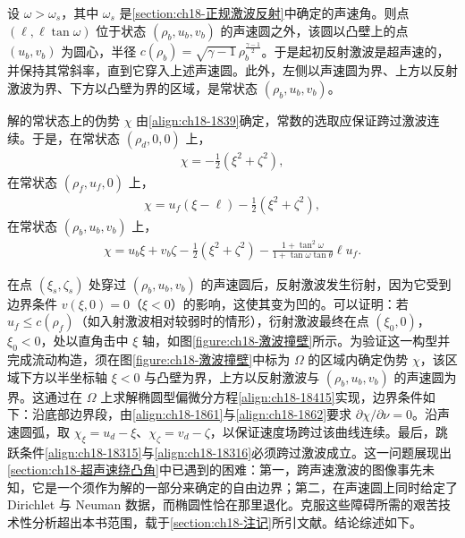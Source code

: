 \documentclass[../../main.tex]{subfiles}
\begin{document}
设 $\omega>\omega_s$，其中 $\omega_s$ 是\cref{section:ch18-正规激波反射}中确定的声速角。则点 $(\ell,\ell\tan\omega)$ 位于状态 $(\rho_b,u_b,v_b)$ 的声速圆之外，该圆以凸壁上的点 $(u_b,v_b)$ 为圆心，半径 $c(\rho_b)=\sqrt{\gamma-1}\,\rho_b^{\frac{\gamma-1}{2}}$。于是起初反射激波是超声速的，并保持其常斜率，直到它穿入上述声速圆。此外，左侧以声速圆为界、上方以反射激波为界、下方以凸壁为界的区域，是常状态 $(\rho_b,u_b,v_b)$。

解的常状态上的伪势 $\chi$ 由\eqref{align:ch18-1839}确定，常数的选取应保证跨过激波连续。于是，在常状态 $(\rho_d,0,0)$ 上，
\begin{align}
\chi=-\frac12(\xi^2+\zeta^2),
\label{align:ch18-1864}
\end{align}
在常状态 $(\rho_f,u_f,0)$ 上，
\begin{align}
\chi=u_f(\xi-\ell)-\frac12(\xi^2+\zeta^2),
\label{align:ch18-1865}
\end{align}
在常状态 $(\rho_b,u_b,v_b)$ 上，
\begin{align}
\chi=u_b\xi+v_b\zeta-\frac12(\xi^2+\zeta^2)-\frac{1+\tan^2\omega}{1+\tan\omega\tan\theta}\ell u_f.
\label{align:ch18-1866}
\end{align}

在点 $(\xi_s,\zeta_s)$ 处穿过 $(\rho_b,u_b,v_b)$ 的声速圆后，反射激波发生衍射，因为它受到边界条件 $v(\xi,0)=0$（$\xi<0$）的影响，这使其变为凹的。可以证明：若 $u_f\leqslant c(\rho_f)$（如入射激波相对较弱时的情形），衍射激波最终在点 $(\xi_0,0)$，$\xi_0<0$，处以直角击中 $\xi$ 轴，如图\cref{figure:ch18-激波撞壁}所示。为验证这一构型并完成流动构造，须在图\cref{figure:ch18-激波撞壁}中标为 $\Omega$ 的区域内确定伪势 $\chi$，该区域下方以半坐标轴 $\xi<0$ 与凸壁为界，上方以反射激波与 $(\rho_b,u_b,v_b)$ 的声速圆为界。这通过在 $\Omega$ 上求解椭圆型偏微分方程\eqref{align:ch18-18415}实现，边界条件如下：沿底部边界段，由\eqref{align:ch18-1861}与\eqref{align:ch18-1862}要求 $\partial\chi/\partial\nu=0$。沿声速圆弧，取 $\chi_\xi=u_d-\xi$、$\chi_\zeta=v_d-\zeta$，以保证速度场跨过该曲线连续。最后，跳跃条件\eqref{align:ch18-18315}与\eqref{align:ch18-18316}必须跨过激波成立。这一问题展现出\cref{section:ch18-超声速绕凸角}中已遇到的困难：第一，跨声速激波的图像事先未知，它是一个须作为解的一部分来确定的自由边界；第二，在声速圆上同时给定了 Dirichlet 与 Neuman 数据，而椭圆性恰在那里退化。克服这些障碍所需的艰苦技术性分析超出本书范围，载于\cref{section:ch18-注记}所引文献。结论综述如下。
\end{document}
